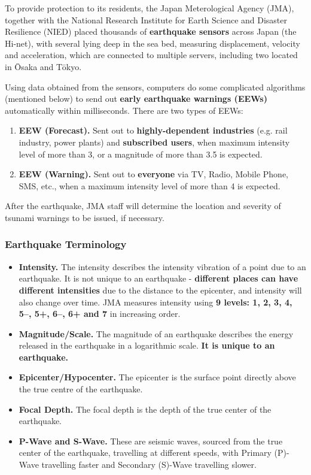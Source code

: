 \documentclass{article}
\begin{document}
To provide protection to its residents, the Japan Meterological Agency (JMA), together with the National Research Institute for Earth Science and Disaster Resilience (NIED) placed thousands of \textbf{earthquake sensors} across Japan (the Hi-net), with several lying deep in the sea bed, measuring displacement, velocity and acceleration, which are connected to multiple servers, including two located in \=Osaka and T\=okyo.

Using data obtained from the sensors, computers do some complicated algorithms (mentioned below) to send out \textbf{early earthquake warnings (EEWs)} automatically within milliseconds. There are two types of EEWs:
\begin{enumerate}
    \item \textbf{EEW (Forecast).} Sent out to \textbf{highly-dependent industries} (e.g. rail industry, power plants) and \textbf{subscribed users}, when maximum intensity level of more than 3, or a magnitude of more than 3.5 is expected.
    \item \textbf{EEW (Warning).} Sent out to \textbf{everyone} via TV, Radio, Mobile Phone, SMS, etc., when a maximum intensity level of more than 4 is expected.
\end{enumerate}

After the earthquake, JMA staff will determine the location and severity of tsunami warnings to be issued, if necessary.

\subsubsection{Earthquake Terminology}

\begin{itemize}
    \item \textbf{Intensity.} The intensity describes the intensity vibration of a point due to an earthquake. It is not unique to an earthquake - \textbf{different places can have different intensities} due to the distance to the epicenter, and intensity will also change over time. JMA measures intensity using \textbf{9 levels: 1, 2, 3, 4, 5--, 5+, 6--, 6+ and 7} in increasing order.
    \item \textbf{Magnitude/Scale.} The magnitude of an earthquake describes the energy released in the earthquake in a logarithmic scale. \textbf{It is unique to an earthquake.}
    \item \textbf{Epicenter/Hypocenter.} The epicenter is the surface point directly above the true centre of the earthquake.
    \item \textbf{Focal Depth.} The focal depth is the depth of the true center of the earthquake.
    \item \textbf{P-Wave and S-Wave.} These are seismic waves, sourced from the true center of the earthquake, travelling at different speeds, with Primary (P)-Wave travelling faster and Secondary (S)-Wave travelling slower.
\end{itemize}
\end{document}
